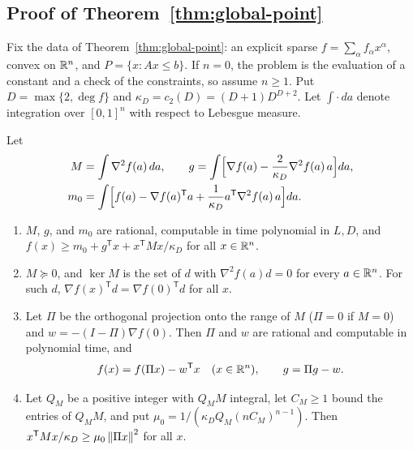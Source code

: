 \subsection{Proof of Theorem~\ref{thm:global-point}}\label{app:points-global}

Fix the data of Theorem~\ref{thm:global-point}: an explicit sparse
$f=\sum_\alpha f_\alpha x^\alpha$, convex on $\mathbb R^n$, and
$P=\{x:Ax\le b\}$. If $n=0$, the problem is the evaluation of a constant
and a check of the constraints, so assume $n\ge1$. Put
$D=\max\{2,\deg f\}$ and $\kappa_D=c_2(D)=(D+1)D^{D+2}$. Let
$\int\cdot\,da$ denote integration over $[0,1]^n$ with respect to Lebesgue
measure.

\begin{lemma}\label{lem:points-minorant}
Let
\begin{align*}
 M&=\int\nabla^2f(a)\,da,\qquad
 g=\int\Bigl[\nabla f(a)-\frac2{\kappa_D}\nabla^2f(a)\,a\Bigr]da,\\
 m_0&=\int\Bigl[f(a)-\nabla f(a)^{\mathsf T}a+
 \frac1{\kappa_D}a^{\mathsf T}\nabla^2f(a)\,a\Bigr]da .
\end{align*}
\begin{enumerate}[label=(\alph*)]
\item $M$, $g$, and $m_0$ are rational, computable in time polynomial in
$L,D$, and $f(x)\ge m_0+g^{\mathsf T}x+x^{\mathsf T}Mx/\kappa_D$ for all
$x\in\mathbb R^n$.
\item $M\succeq0$, and $\ker M$ is the set of $d$ with $\nabla^2f(a)d=0$
for every $a\in\mathbb R^n$. For such $d$, $\nabla f(x)^{\mathsf T}d=
\nabla f(0)^{\mathsf T}d$ for all $x$.
\item Let $\Pi$ be the orthogonal projection onto the range of $M$
($\Pi=0$ if $M=0$) and $w=-(I-\Pi)\nabla f(0)$. Then $\Pi$ and $w$ are
rational and computable in polynomial time, and
\[
 f(x)=f(\Pi x)-w^{\mathsf T}x\quad(x\in\mathbb R^n),\qquad g=\Pi g-w .
\]
\item Let $Q_M$ be a positive integer with $Q_MM$ integral, let
$C_M\ge1$ bound the entries of $Q_MM$, and put
$\mu_0=1/(\kappa_DQ_M(nC_M)^{n-1})$. Then
$x^{\mathsf T}Mx/\kappa_D\ge\mu_0\left\lVert\Pi x\right\rVert^2$ for all $x$.
\end{enumerate}
\end{lemma}

